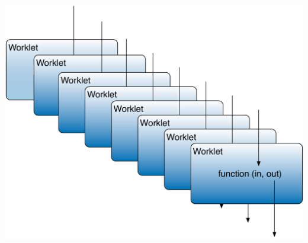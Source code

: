 \documentclass[brown]{beamer}
\begin{document}
\frame
{
  \begin{center}
  \includegraphics[width=\textwidth]{images/many_worklets.pdf}
  \end{center}
}
\end{document}
